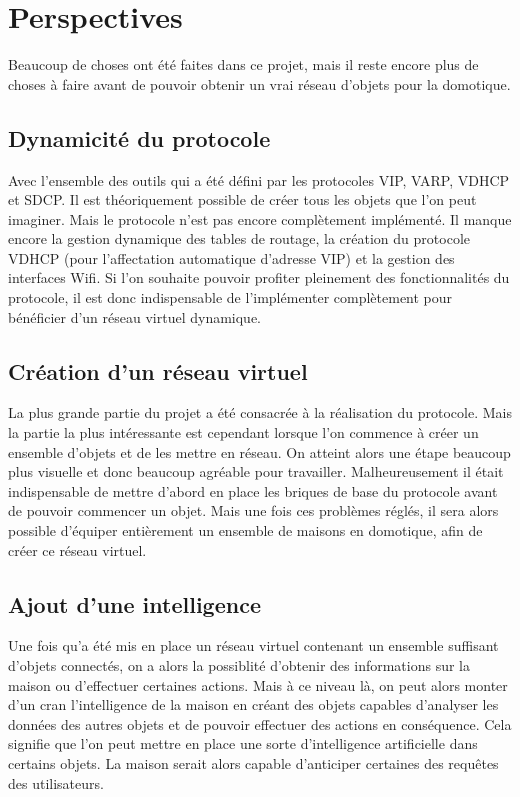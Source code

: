 \chapter*{Perspectives}

Beaucoup de choses ont été faites dans ce projet, mais il reste encore plus de choses à faire avant
de pouvoir obtenir un vrai réseau d'objets pour la domotique.

\section*{Dynamicité du protocole}
	Avec l'ensemble des outils qui a été défini par les protocoles VIP, VARP, VDHCP et SDCP. Il 
	est théoriquement possible de créer tous les objets que l'on peut imaginer. Mais le protocole
	n'est pas encore complètement implémenté. Il manque encore la gestion dynamique des tables de
	routage, la création du protocole VDHCP (pour l'affectation automatique d'adresse VIP) et la 
	gestion des interfaces Wifi. Si l'on souhaite pouvoir profiter pleinement des fonctionnalités
	du protocole, il est donc indispensable de l'implémenter complètement pour bénéficier d'un
	réseau virtuel dynamique.

\section*{Création d'un réseau virtuel}
	La plus grande partie du projet a été consacrée à la réalisation du protocole. Mais la partie
	la plus intéressante est cependant lorsque l'on commence à créer un ensemble d'objets et de les
	mettre en réseau. On atteint alors une étape beaucoup plus visuelle et donc beaucoup agréable 
	pour travailler. Malheureusement il était indispensable de mettre d'abord en place les briques
	de base du protocole avant de pouvoir commencer un objet. Mais une fois ces problèmes
	réglés, il sera alors possible d'équiper entièrement un ensemble de maisons en domotique, afin de 
	créer ce réseau virtuel.

\section*{Ajout d'une intelligence}
	Une fois qu'a été mis en place un réseau virtuel contenant un ensemble suffisant d'objets 
	connectés, on a alors la possiblité d'obtenir des informations sur la maison ou d'effectuer
	certaines actions. Mais à ce niveau là, on peut alors monter d'un cran l'intelligence de la
	maison en créant des objets capables d'analyser les données des autres objets et de pouvoir
	effectuer des actions en conséquence. Cela signifie que l'on peut mettre en place une sorte
	d'intelligence artificielle dans certains objets. La maison serait alors capable d'anticiper
	certaines des requêtes des utilisateurs.

